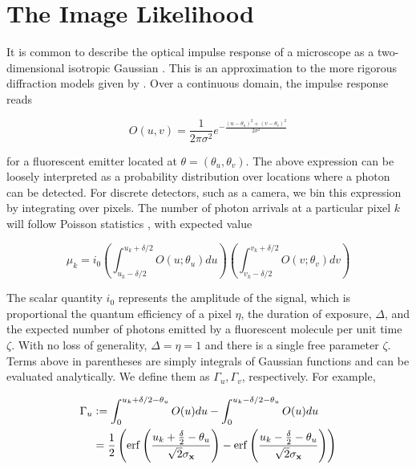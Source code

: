 \section{The Image Likelihood}

It is common to describe the optical impulse response of a microscope as a two-dimensional isotropic Gaussian \parencite{Zhang2007}. This is an approximation to the more rigorous diffraction models given by \parencite{Richards1959,Gibson1989}. Over a continuous domain, the impulse response reads

\begin{equation}
O(u,v) = \frac{1}{2\pi\sigma^{2}}e^{-\frac{(u-\theta_{u})^{2}+(v-\theta_{v})^{2}}{2\sigma^{2}}}
\end{equation}

for a fluorescent emitter located at $\theta = (\theta_u,\theta_v)$. The above expression can be loosely interpreted as a probability distribution over locations where a photon can be detected. For discrete detectors, such as a camera, we bin this expression by integrating over pixels. The number of photon arrivals at a particular pixel $k$ will follow Poisson statistics \parencite{Smith2010,Huang2013}, with expected value

\begin{equation}
\mu_{k} = i_{0}\left(\int_{u_{k}-\delta /2}^{u_{k}+\delta /2} O(u; \theta_{u})du \right)\left(\int_{v_{k}-\delta /2}^{v_{k}+\delta /2} O(v;\theta_{v})dv \right)
\end{equation}

The scalar quantity $i_{0}$ represents the amplitude of the signal, which is proportional the quantum efficiency of a pixel $\eta$, the duration of exposure, $\Delta$, and the expected number of photons emitted by a fluorescent molecule per unit time $\zeta$. With no loss of generality, $\Delta = \eta = 1$ and there is a single free parameter $\zeta$. Terms above in parentheses are simply integrals of Gaussian functions and can be evaluated analytically. We define them as $\Gamma_{u},\Gamma_{v}$, respectively. For example,

\begin{align*}
\Gamma_{u} &\vcentcolon =  \int_{0}^{u_{k}+\delta /2 - \theta_{u}} O(u)du - \int_{0}^{u_{k}-\delta /2 - \theta_{u}} O(u)du\\
&= \frac{1}{2}\left(\mathrm{erf}\left(\frac{u_{k}+\frac{\delta}{2}-\theta_{u}}{\sqrt{2}\sigma_{\bold{x}}}\right) -\mathrm{erf}\left(\frac{u_{k}-\frac{\delta}{2}-\theta_{u}}{\sqrt{2}\sigma_{\bold{x}}}\right)\right)
\end{align*}

